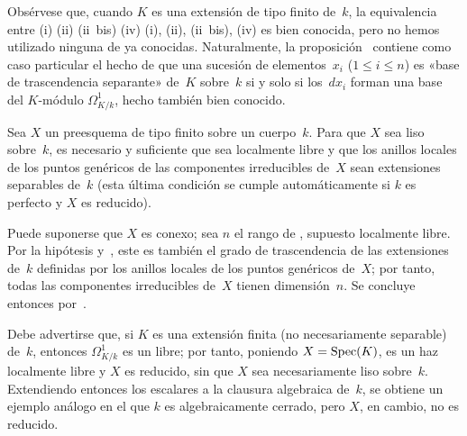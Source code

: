 
Obsérvese que, cuando $K$ es una extensión de tipo finito de~$k$, la equivalencia entre
{(i) (ii) (ii~bis) (iv)}
{(i), (ii), (ii~bis), (iv)}
es bien conocida, pero no hemos utilizado ninguna de
ya conocidas. Naturalmente, la proposición~ contiene como caso particular el hecho de que una sucesión de elementos~$x_i$ ($1\leq i\leq n$) es
«base de trascendencia separante» de~$K$ sobre~$k$ si y solo si los~$dx_i$ forman una base del $K$-módulo $\Omega^1_{K/k}$, hecho también bien conocido.

\begin{corollaire}
\label{II.5.7}
Sea $X$ un preesquema de tipo finito sobre un cuerpo~$k$. Para que $X$ sea liso sobre~$k$, es necesario y suficiente que
sea localmente libre y que los anillos locales de los puntos genéricos de las componentes irreducibles de~$X$ sean extensiones separables de~$k$ (esta última condición se cumple automáticamente si $k$ es perfecto y $X$ es reducido).
\end{corollaire}

Puede suponerse que $X$ es conexo; sea $n$ el rango de
,
supuesto localmente libre. Por la hipótesis y~, este es también el grado de trascendencia de las extensiones
de~$k$ definidas por los anillos locales de los puntos genéricos de~$X$; por tanto, todas las componentes irreducibles de~$X$ tienen dimensión~$n$. Se concluye entonces por~.

Debe advertirse que, si $K$ es una extensión finita (no necesariamente separable) de~$k$, entonces $\Omega^1_{K/k}$ es un
libre; por tanto, poniendo $X=\operatorname{Spec}(K)$,
es un haz localmente libre y $X$ es reducido, sin que $X$ sea necesariamente liso sobre~$k$. Extendiendo entonces los escalares a la clausura algebraica de~$k$, se obtiene un ejemplo análogo en el que $k$ es algebraicamente cerrado, pero $X$, en cambio, no es reducido.

